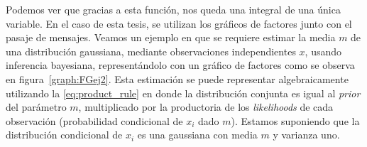 \documentclass[11pt,twoside,spanish]{report} %
\begin{document}
Podemos ver que gracias a esta funci\'on, nos queda una integral de una \'unica variable.
%
En el caso de esta tesis, se utilizan los gr\'aficos de factores junto con el pasaje de mensajes.
Veamos un ejemplo en que se requiere estimar  la media $m$ de una distribuci\'on gaussiana, mediante observaciones independientes $x$, usando inferencia bayesiana, represent\'andolo con un gr\'afico de factores como se observa en figura~\ref{graph:FGej2}. 
Esta estimaci\'on se puede representar algebraicamente utilizando la \ref{eq:product_rule} en donde la distribuci\'on conjunta es igual al \textit{prior} del par\'ametro $m$, multiplicado por la productoria de los \emph{likelihoods} de cada observaci\'on (probabilidad condicional de $x_i$ dado $m$).
Estamos suponiendo que la distribuci\'on condicional de $x_i$ es una gaussiana con media $m$ y varianza uno.
\end{document}
